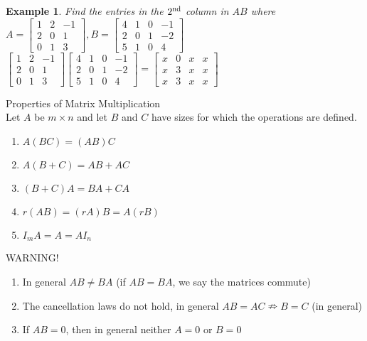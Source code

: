\documentclass[a4paper,12pt,openany]{book}
\theoremstyle{defn}
\theoremstyle{expl}
\newtheorem{expl}{Example}[section]
\begin{document}
\begin{expl}
\textup{Find the entries in the $2^{\textup{nd}}$ column in $AB$ where\\ $A=\left[\begin{array}{ccc}1&2&-1\\2&0&1\\0&1&3\end{array}\right],B=\left[\begin{array}{cccc}4&1&0&-1\\2&0&1&-2\\5&1&0&4\end{array}\right]$}\\
$\left[\begin{array}{ccc}1&2&-1\\2&0&1\\0&1&3\end{array}\right]\left[\begin{array}{cccc}4&1&0&-1\\2&0&1&-2\\5&1&0&4\end{array}\right]=\left[\begin{array}{cccc}x&0&x&x\\x&3&x&x\\x&3&x&x\end{array}\right]$
\end{expl}
\noindent Properties of Matrix Multiplication\\
Let $A$ be $m\times n$ and let $B$ and $C$ have sizes for which the operations are defined.
\begin{multicols}{2}
\begin{enumerate}
\item $A(BC)=(AB)C$
\item $A(B+C)=AB+AC$
\item $(B+C)A=BA+CA$
\item $r(AB)=(rA)B=A(rB)$
\item $I_mA=A=AI_n$
\end{enumerate}
\end{multicols}
\noindent WARNING!
\begin{enumerate}
\item In general $AB\neq BA$ (if $AB=BA$, we say the matrices commute)
\item The cancellation laws do not hold, in general $AB=AC \nRightarrow B=C$ (in general)
\item If $AB=0$, then in general neither $A=0$ or $B=0$
\end{enumerate}
\end{document}
